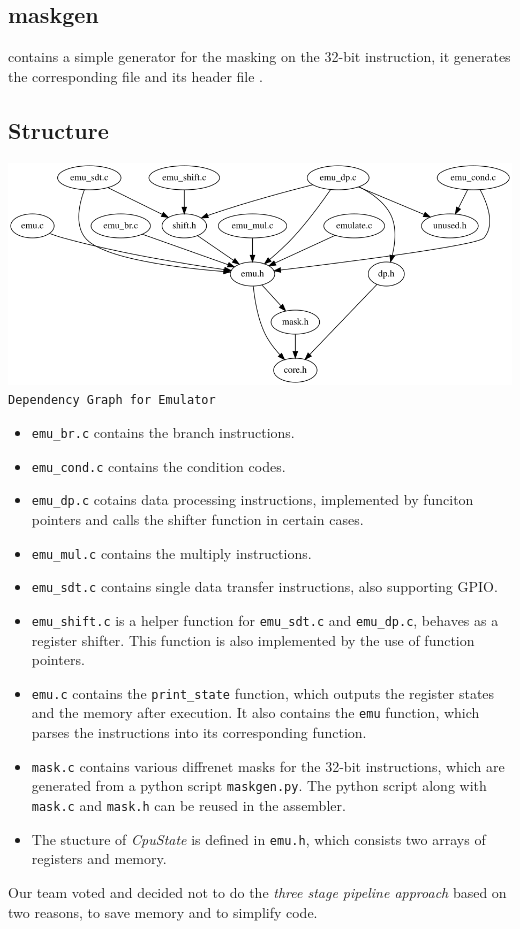 \documentclass[11pt]{article}
\begin{document}
\subsection{maskgen}
 contains a simple generator for the masking on the 32-bit instruction, it generates the corresponding file  and its header file .

\subsection{Structure}
\begin{center}
\includegraphics[scale=0.45]{interim/dependency.png}\\
\texttt{Dependency Graph for Emulator}
\end{center}

\begin{itemize}
\item \texttt{emu\_br.c} contains the branch instructions.
\item \texttt{emu\_cond.c} contains the condition codes.
\item \texttt{emu\_dp.c} cotains data processing instructions, implemented by funciton pointers and calls the shifter function in certain cases.
\item \texttt{emu\_mul.c} contains the multiply instructions.
\item \texttt{emu\_sdt.c} contains single data transfer instructions, also supporting GPIO.
\item \texttt{emu\_shift.c} is a helper function for \texttt{emu\_sdt.c} and \texttt{emu\_dp.c}, behaves as a register shifter. This function is also implemented by the use of function pointers.
\item \texttt{emu.c} contains the \texttt{print\_state} function, which outputs the register states and the memory after execution. It also contains the \texttt{emu} function, which parses the instructions into its corresponding function.
\item \texttt{mask.c} contains various diffrenet masks for the 32-bit instructions, which are generated from a python script \texttt{maskgen.py}. The python script along with \texttt{mask.c} and \texttt{mask.h} can be reused in the assembler.
\item The stucture of \textit{CpuState} is defined in \texttt{emu.h}, which consists two arrays of registers and memory.
\end{itemize}
Our team voted and decided not to do the \textit{three stage pipeline approach} based on two reasons, to save memory and to simplify code. 
\end{document}
